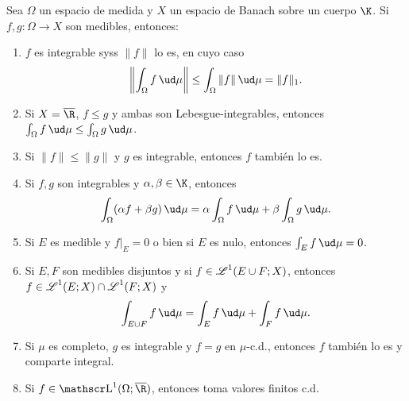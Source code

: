 \begin{prop}
	Sea $\Omega$ un espacio de medida y $X$ un espacio de Banach sobre un cuerpo $\K$.
	Si $f,g\colon \Omega \to X$ son medibles, entonces:
	\begin{enumerate}
		\item $f$ es integrable syss $\|f\|$ lo es,
			en cuyo caso
			$$ \left\| \int_\Omega f\,\ud\mu \right\| \le \int_\Omega \|f\|\,\ud\mu = \|f\|_1. $$
		\item Si $X = \overline\R$, $f \le g$ y ambas son Lebesgue-integrables, entonces $\int_\Omega f\,\ud\mu \le \int_\Omega g\,\ud\mu$.
		\item Si $\|f\| \le \|g\|$ y $g$ es integrable, entonces $f$ también lo es.
		\item Si $f,g$ son integrables y $\alpha,\beta\in\K$, entonces
			$$ \int_\Omega (\alpha f + \beta g)\,\ud\mu = \alpha\int_\Omega f\,\ud\mu + \beta\int_\Omega g\,\ud\mu. $$
		\item Si $E$ es medible y $f|_E = 0$ o bien si $E$ es nulo, entonces $\int_E f\,\ud\mu = 0$.
		\item Si $E, F$ son medibles disjuntos y si $f\in \operatorname{\mathscr{L}}^1(E\cup F; X)$, entonces $f\in \operatorname{\mathscr{L}}^1(E; X)\cap \operatorname{\mathscr{L}}^1(F; X)$ y
			$$ \int_{E\cup F} f\,\ud\mu = \int_E f\,\ud\mu + \int_F f\,\ud\mu. $$
		\item Si $\mu$ es completo, $g$ es integrable y $f = g$ en $\mu$-c.d., entonces $f$ también lo es y comparte integral.
		\item Si $f \in \LL^1(\Omega; \overline\R)$, entonces toma valores finitos c.d.
	\end{enumerate}
\end{prop}


